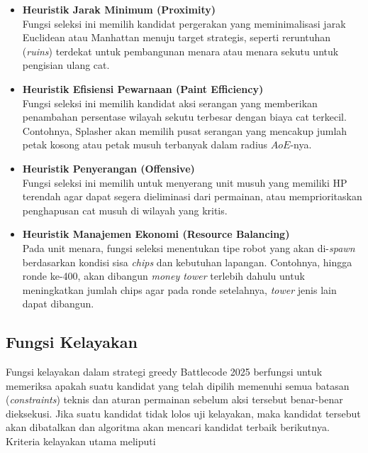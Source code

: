 \begin{itemize}
    \item \textbf{Heuristik Jarak Minimum (Proximity)}\\
          Fungsi seleksi ini memilih kandidat pergerakan yang meminimalisasi jarak Euclidean atau Manhattan menuju target strategis, seperti reruntuhan (\textit{ruins}) terdekat untuk pembangunan menara atau menara sekutu untuk pengisian ulang cat.

    \item \textbf{Heuristik Efisiensi Pewarnaan (Paint Efficiency)}\\
          Fungsi seleksi ini memilih kandidat aksi serangan yang memberikan penambahan persentase wilayah sekutu terbesar dengan biaya cat terkecil. Contohnya, Splasher akan memilih pusat serangan yang mencakup jumlah petak kosong atau petak musuh terbanyak dalam radius $AoE$-nya.

    \item \textbf{Heuristik Penyerangan (Offensive)}\\
          Fungsi seleksi ini memilih untuk menyerang unit musuh yang memiliki HP terendah agar dapat segera dieliminasi dari permainan, atau memprioritaskan penghapusan cat musuh di wilayah yang kritis.

    \item \textbf{Heuristik Manajemen Ekonomi (Resource Balancing)}\\
          Pada unit menara, fungsi seleksi menentukan tipe robot yang akan di-\textit{spawn} berdasarkan kondisi sisa \textit{chips} dan kebutuhan lapangan. Contohnya, hingga ronde ke-400, akan dibangun \textit{money tower} terlebih dahulu untuk meningkatkan jumlah chips agar pada ronde setelahnya, \textit{tower} jenis lain dapat dibangun.
\end{itemize}

\subsection{Fungsi Kelayakan}

Fungsi kelayakan dalam strategi greedy Battlecode 2025 berfungsi untuk memeriksa apakah suatu kandidat yang telah dipilih memenuhi semua batasan (\textit{constraints}) teknis dan aturan permainan sebelum aksi tersebut benar-benar dieksekusi. Jika suatu kandidat tidak lolos uji kelayakan, maka kandidat tersebut akan dibatalkan dan algoritma akan mencari kandidat terbaik berikutnya. Kriteria kelayakan utama meliputi

